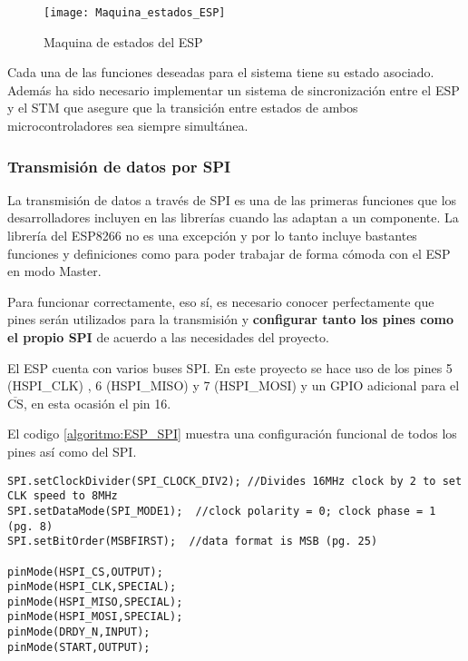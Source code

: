 \begin{figure} [h]
    \centering
    \texttt{[image: Maquina\_estados\_ESP]}
    \caption{Maquina de estados del ESP}
    \label{fig:Maquina_estados_ESP}
\end{figure}

Cada una de las funciones deseadas para el sistema tiene su estado asociado. Además ha sido necesario implementar un sistema de sincronización entre el ESP y el STM que asegure que la transición entre estados de ambos microcontroladores sea siempre simultánea.

\clearpage

\subsubsection{Transmisión de datos por SPI\label{sec:Software_Arduino_Com}}

La transmisión de datos a través de SPI es una de las primeras funciones que los desarrolladores incluyen en las librerías cuando las adaptan a un componente. La librería del ESP8266 no es una excepción y por lo tanto incluye bastantes funciones y definiciones como para poder trabajar de forma cómoda con el ESP en modo Master.

Para funcionar correctamente, eso sí, es necesario conocer perfectamente que pines serán utilizados para la transmisión y \textbf{configurar tanto los pines como el propio SPI} de acuerdo a las necesidades del proyecto.

El ESP cuenta con varios buses SPI. En este proyecto se hace uso de los pines 5 (HSPI\_CLK) , 6 (HSPI\_MISO) y 7 (HSPI\_MOSI) y un GPIO adicional para el $\overline{\text{CS}}$, en esta ocasión el pin 16.

El codigo \ref{algoritmo:ESP_SPI} muestra una configuración funcional de todos los pines así como del SPI.

\begin{lstlisting}[label=algoritmo:ESP_SPI,style = STM-code,frame=single,caption=Configuración de pines para el uso de SPI]
SPI.setClockDivider(SPI_CLOCK_DIV2); //Divides 16MHz clock by 2 to set CLK speed to 8MHz
SPI.setDataMode(SPI_MODE1);  //clock polarity = 0; clock phase = 1 (pg. 8)
SPI.setBitOrder(MSBFIRST);  //data format is MSB (pg. 25)  
  
pinMode(HSPI_CS,OUTPUT);
pinMode(HSPI_CLK,SPECIAL);
pinMode(HSPI_MISO,SPECIAL);
pinMode(HSPI_MOSI,SPECIAL);
pinMode(DRDY_N,INPUT);
pinMode(START,OUTPUT);
\end{lstlisting}

